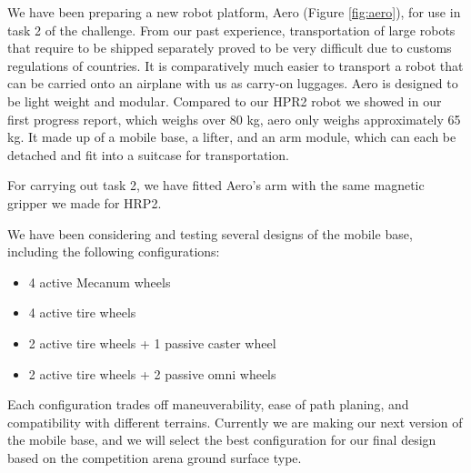 \documentclass{standalone}
\begin{document}
We have been preparing a new robot platform, Aero (Figure \ref{fig:aero}), for use in task 2 of the challenge. From our past experience, transportation of large robots that require to be shipped separately proved to be very difficult due to customs regulations of countries. It is comparatively much easier to transport a robot that can be carried onto an airplane with us as carry-on luggages. Aero is designed to be light weight and modular. Compared to our HPR2 robot we showed in our first progress report, which weighs over 80 kg, aero only weighs approximately 65 kg. It made up of a mobile base, a lifter, and an arm module, which can each be detached and fit into a suitcase for transportation. 

For carrying out task 2, we have fitted Aero's arm with the same magnetic gripper we made for HRP2. 

We have been considering and testing several designs of the mobile base, including the following configurations:
\begin{itemize}
	\item 4 active Mecanum wheels 
	\item 4 active tire wheels
	\item 2 	active tire wheels + 1 passive caster wheel
	\item 2 	active tire wheels + 2 passive omni wheels
\end{itemize}

Each configuration trades off maneuverability, ease of path planing, and compatibility with different terrains. Currently we are making our next version of the mobile base, and we will select the best configuration for our final design based on the competition arena ground surface type. 
\end{document}
